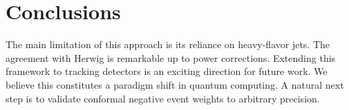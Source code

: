 \section{Conclusions}\label{sec:conclusions}

The main limitation of this approach is its reliance on heavy-flavor
jets. The agreement with Herwig is remarkable up to power corrections.
Extending this framework to tracking detectors is an exciting direction
for future work. We believe this constitutes a paradigm shift in quantum
computing. A natural next step is to validate conformal negative event
weights to arbitrary precision.

